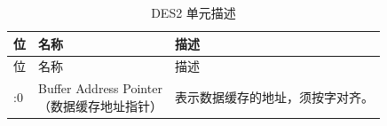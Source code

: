 \begin{longtable}[c]{ |p{3cm}|p{4cm}|p{8cm}| }
\caption{DES2 单元描述} \label{tab:sdhost-DES2}\\
\hline
\rowcolor{lightgray}
位 &名称 & 描述\\
\hline
\endfirsthead
\hline
\rowcolor{lightgray}
位 &名称 & 描述 \\
\hline
\endhead
\endfoot
31:0 &\makecell[l]{Buffer Address Pointer\\（数据缓存地址指针）}& 表示数据缓存的地址，须按字对齐。\\\hline
\end{longtable}
